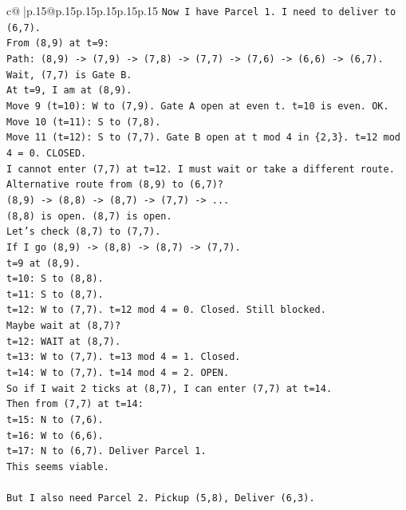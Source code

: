 \documentclass{article}
\begin{document}
{\begin{supertabular}{c@{$\;$}|p{.15\linewidth}@{}p{.15\linewidth}p{.15\linewidth}p{.15\linewidth}p{.15\linewidth}p{.15\linewidth}}
{{{\texttt{Now I have Parcel 1. I need to deliver to (6,7).} \\
\texttt{From (8,9) at t=9:} \\
\texttt{Path: (8,9) {-}> (7,9) {-}> (7,8) {-}> (7,7) {-}> (7,6) {-}> (6,6) {-}> (6,7).} \\
\texttt{Wait, (7,7) is Gate B.} \\
\texttt{At t=9, I am at (8,9).} \\
\texttt{Move 9 (t=10): W to (7,9). Gate A open at even t. t=10 is even. OK.} \\
\texttt{Move 10 (t=11): S to (7,8).} \\
\texttt{Move 11 (t=12): S to (7,7). Gate B open at t mod 4 in \{2,3\}. t=12 mod 4 = 0. CLOSED.} \\
\texttt{I cannot enter (7,7) at t=12. I must wait or take a different route.} \\
\texttt{Alternative route from (8,9) to (6,7)?} \\
\texttt{(8,9) {-}> (8,8) {-}> (8,7) {-}> (7,7) {-}> ...} \\
\texttt{(8,8) is open. (8,7) is open.} \\
\texttt{Let's check (8,7) to (7,7).} \\
\texttt{If I go (8,9) {-}> (8,8) {-}> (8,7) {-}> (7,7).} \\
\texttt{t=9 at (8,9).} \\
\texttt{t=10: S to (8,8).} \\
\texttt{t=11: S to (8,7).} \\
\texttt{t=12: W to (7,7). t=12 mod 4 = 0. Closed. Still blocked.} \\
\texttt{Maybe wait at (8,7)?} \\
\texttt{t=12: WAIT at (8,7).} \\
\texttt{t=13: W to (7,7). t=13 mod 4 = 1. Closed.} \\
\texttt{t=14: W to (7,7). t=14 mod 4 = 2. OPEN.} \\
\texttt{So if I wait 2 ticks at (8,7), I can enter (7,7) at t=14.} \\
\texttt{Then from (7,7) at t=14:} \\
\texttt{t=15: N to (7,6).} \\
\texttt{t=16: W to (6,6).} \\
\texttt{t=17: N to (6,7). Deliver Parcel 1.} \\
\texttt{This seems viable.} \\
\\ 
\texttt{But I also need Parcel 2. Pickup (5,8), Deliver (6,3).} \\
}}}
\end{supertabular}}
\end{document}
